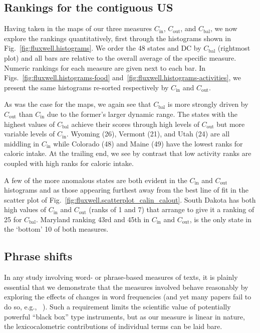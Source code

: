 \documentclass[10pt]{article}
\newcommand{\calin}{C_{\textrm{in}}}
\newcommand{\calout}{C_{\textrm{out}}}
\newcommand{\calbal}{C_{\textrm{bal}}}
\begin{document}
\subsection*{Rankings for the contiguous US}
\label{subsec:fluxwell.rankings}

Having taken in the maps of our three measures
$\calin$, $\calout$, and $\calbal$,
we now explore the rankings quantitatively, 
first through the histograms 
shown in Fig.~\ref{fig:fluxwell.histograms}.
We order the 48 states and DC by $\calbal$ (rightmost plot)
and all bars are relative to the overall average
of the specific measure.
Numeric rankings for each measure are given next to each bar.
In Figs.~\ref{fig:fluxwell.histograms-food}
and~\ref{fig:fluxwell.histograms-activities},
we present the same histograms re-sorted
respectively by $\calin$ and $\calout$.

As was the case for the maps, we again see that $\calbal$ is more strongly 
driven by $\calout$ than $\calin$ due to the former's larger
dynamic range.
The states with the highest values of $\calbal$ achieve
their scores through high levels of $\calout$ but
more variable levels of $\calin$.
Wyoming (26), Vermont (21), and Utah (24)
are all middling in $\calin$ while 
Colorado (48) and Maine (49) have the lowest ranks
for caloric intake.
At the trailing end, we see by contrast
that low activity ranks are coupled with high ranks for caloric intake.

A few of the more anomalous states are both evident
in the $\calin$ and $\calout$ histograms and 
as those appearing furthest away from the best line of fit
in the scatter plot of Fig.~\ref{fig:fluxwell.scatterplot_calin_calout}.
South Dakota has both high values of $\calin$ and $\calout$ 
(ranks of 1 and 7)
that arrange to give it a ranking of 25 for $\calbal$.
Maryland ranking 43rd and 45th in $\calin$ and $\calout$,
is the only state in the `bottom' 10 of both measures.

\subsection*{Phrase shifts}
\label{subsec:fluxwell.phraseshifts}

In any study involving word- or phrase-based measures of texts,
it is plainly essential that we demonstrate that the measures 
involved behave reasonably by exploring the
effects of changes in word frequencies 
(and yet many papers fail to do so, e.g., ~\cite{golder2011a}).
Such a requirement limits the scientific 
value of potentially powerful ``black box'' type instruments,
but as our measure is linear in nature, the 
lexicocalometric contributions
of individual terms can be laid bare.
\end{document}
